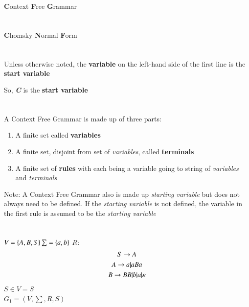\documentclass[12pt,letterpaper]{article}
\begin{document}
	
	\section{}
	\textbf{C}ontext \textbf{F}ree \textbf{G}rammar
	\section{}
	\textbf{C}homsky \textbf{N}ormal \textbf{F}orm
	\section{}
	Unless otherwise noted, the \textbf{variable} on the left-hand side of the first line is the \textbf{start variable}
	
	So, \textit{\textbf{C}} is the \textbf{start variable}
	\section{}
	A Context Free Grammar is made up of three parts:
	\begin{enumerate}
		\item A finite set called \textbf{variables}
		\item A finite set, disjoint from set of \textit{variables}, called \textbf{terminals}
		\item A finite set of \textbf{rules} with each being a variable going to string of \textit{variables} and \textit{terminals}
	\end{enumerate}
	Note: A Context Free Grammar also is made up \textit{starting variable} but does not always need to be defined. If the \textit{starting variable} is not defined, the variable in the first rule is assumed to be the \textit{starting variable}
	\section{}
	\subsection{}
		$V=\{A,B,S\}\\\sum=\{a,b\}\\$
		$R:$
		\begin{gather*}
			S \rightarrow A\\
			A \rightarrow a\arrowvert aBa\\
			B \rightarrow BB\arrowvert b\arrowvert a\arrowvert\varepsilon
		\end{gather*}
		$S\in V=S$\\
		$G_1=(V,\sum,R,S)$
\end{document}
